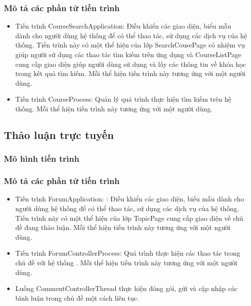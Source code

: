 \documentclass[./../main.tex]{subfiles}
\begin{document}
\subsubsection{Mô tả các phần tử tiến trình}
\begin{itemize}
	\item Tiến trình CourseSearchApplication: Điều khiển các giao diện, biểu mẫu dành cho người dùng hệ thống để có thể thao tác, sử dụng các dịch vụ của hệ thống. Tiến trình này có một thể hiện của lớp SearchCousePage có nhiệm vụ giúp người sử dụng các thao tác tìm kiếm trên ứng dụng và CourseListPage cung cấp giao diện giúp người dùng sử dụng và lấy các thông tin về khóa học trong kết quả tìm kiếm.
	Mỗi thể hiện tiến trình này tương ứng với một người dùng.
	\item Tiến trình CourseProcess: Quản lý quá trình thực hiện tìm kiếm trên hệ thống.
	Mỗi thể hiện tiến trình này tương ứng với một người dùng.
	
\end{itemize}

\subsection{Thảo luận trực tuyến}

\subsubsection{Mô hình tiến trình}


\subsubsection{Mô tả các phần tử tiến trình}
\begin{itemize}
	\item Tiến trình ForumApplication: : Điều khiển các giao diện, biểu mẫu dành cho người dùng hệ thống để có thể thao tác, sử dụng các dịch vụ của hệ thống. Tiến trình này có một thể hiện của lớp TopicPage cung cấp giao diện về chủ đề đang thảo luận.
	Mỗi thể hiện tiến trình này tương ứng với một người dùng.
	\item Tiến trình ForumControllerProcess: Quá trình thực hiện các thao tác trong chủ đề với hệ thống .
	Mỗi thể hiện tiến trình này tương ứng với một người dùng.
	\item Luồng CommentControllerThread thực hiện đóng gói, gửi và cập nhập các bình luận trong chủ đề một cách liên tục.
	
\end{itemize}
\end{document}
